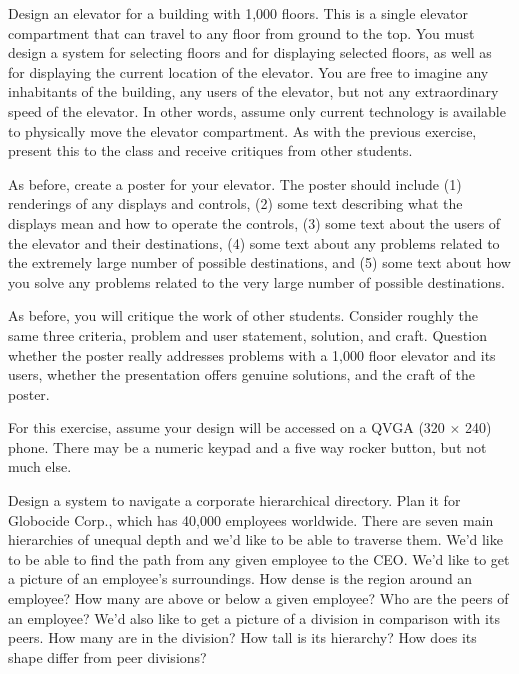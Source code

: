 Design an elevator for a building with 1,000 floors. This is a single
elevator compartment that can travel to any floor from ground to the
top. You must design a system for selecting floors and for displaying
selected floors, as well as for displaying the current location of the
elevator. You are free to imagine any inhabitants of the building, any
users of the elevator, but not any extraordinary speed of the elevator.
In other words, assume only current technology is available to
physically move the elevator compartment. As with the previous exercise,
present this to the class and receive critiques from other students.

As before, create a poster for your elevator. The poster should include
(1) renderings of any displays and controls, (2) some text describing
what the displays mean and how to operate the controls, (3) some text
about the users of the elevator and their destinations, (4) some text
about any problems related to the extremely large number of possible
destinations, and (5) some text about how you solve any problems related
to the very large number of possible destinations.

As before, you will critique the work of other students. Consider
roughly the same three criteria, problem and user statement, solution,
and craft. Question whether the poster really addresses problems with a
1,000 floor elevator and its users, whether the presentation offers
genuine solutions, and the craft of the poster.

\hypertarget{corporate-directory-navigator}{%
\label{corporate-directory-navigator}}

For this exercise, assume your design will be accessed on a QVGA (320
\(\times\) 240) phone. There may be a numeric keypad and a five way
rocker button, but not much else.

Design a system to navigate a corporate hierarchical directory. Plan it
for Globocide Corp., which has 40,000 employees worldwide. There are
seven main hierarchies of unequal depth and we'd like to be able to
traverse them. We'd like to be able to find the path from any given
employee to the CEO. We'd like to get a picture of an employee's
surroundings. How dense is the region around an employee? How many are
above or below a given employee? Who are the peers of an employee? We'd
also like to get a picture of a division in comparison with its peers.
How many are in the division? How tall is its hierarchy? How does its
shape differ from peer divisions?

